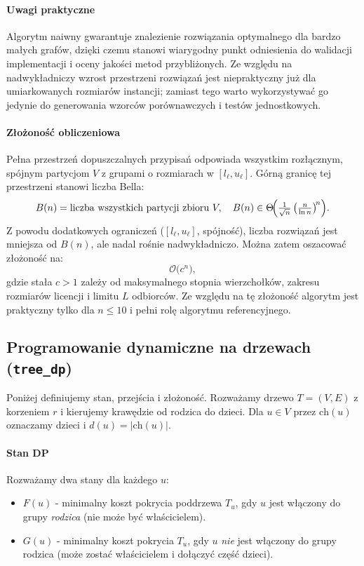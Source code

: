 \paragraph{Uwagi praktyczne}
Algorytm naiwny gwarantuje znalezienie rozwiązania optymalnego dla bardzo małych grafów, dzięki czemu stanowi wiarygodny punkt odniesienia do walidacji implementacji i oceny jakości metod przybliżonych. Ze względu na nadwykładniczy wzrost przestrzeni rozwiązań jest niepraktyczny już dla umiarkowanych rozmiarów instancji; zamiast tego warto wykorzystywać go jedynie do generowania wzorców porównawczych i testów jednostkowych.

\paragraph{Złożoność obliczeniowa}
Pełna przestrzeń dopuszczalnych przypisań odpowiada wszystkim rozłącznym, spójnym partycjom $V$ z grupami o rozmiarach w $[l_\ell,u_\ell]$. Górną granicę tej przestrzeni stanowi liczba Bella:
\[
B(n)=\text{liczba wszystkich partycji zbioru }V,\quad
B(n)\in\Theta\!\Bigl(\tfrac{1}{\sqrt n}\,\bigl(\tfrac{n}{\ln n}\bigr)^{\!n}\Bigr).
\]
Z powodu dodatkowych ograniczeń ($[l_\ell,u_\ell]$, spójność), liczba rozwiązań jest mniejsza od $B(n)$, ale nadal rośnie nadwykładniczo. Można zatem oszacować złożoność na:
\[
\mathcal{O}\bigl(c^n\bigr),
\]
gdzie stała $c>1$ zależy od maksymalnego stopnia wierzchołków, zakresu rozmiarów licencji i limitu $L$ odbiorców. Ze względu na tę złożoność algorytm jest praktyczny tylko dla $n\le10$ i pełni rolę algorytmu referencyjnego.

\subsection{Programowanie dynamiczne na drzewach (\texttt{tree\_dp})}\label{subsec:treedp}
Poniżej definiujemy stan, przejścia i złożoność. Rozważamy drzewo $T=(V,E)$ z korzeniem $r$ i kierujemy krawędzie od rodzica do dzieci. Dla $u\in V$ przez $\mathrm{ch}(u)$ oznaczamy dzieci i $d(u)=|\mathrm{ch}(u)|$.

\paragraph{Stan DP}
Rozważamy dwa stany dla każdego $u$:
\begin{itemize}
  \item $F(u)$ - minimalny koszt pokrycia poddrzewa $T_u$, gdy $u$ jest włączony do grupy \emph{rodzica} (nie może być właścicielem).
  \item $G(u)$ - minimalny koszt pokrycia $T_u$, gdy $u$ \emph{nie} jest włączony do grupy rodzica (może zostać właścicielem i dołączyć część dzieci).
\end{itemize}

